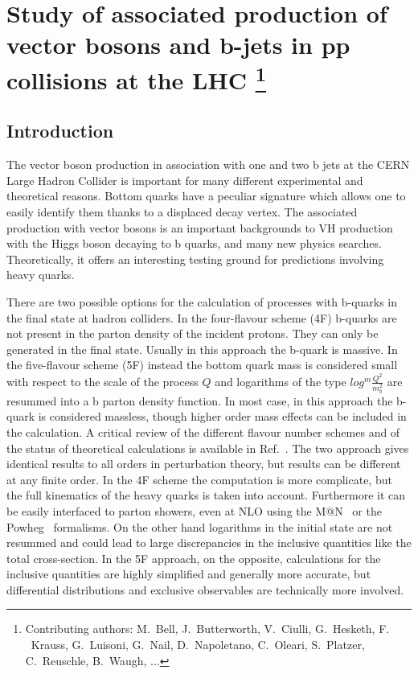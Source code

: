 \documentclass[11pt]{cernrep} \usepackage{graphicx,epsfig} 
\makeatletter
\newcommand{\MCatNLO}{M\protect\scalebox{0.8}{C}@N\protect\scalebox{0.8}{LO}\xspace}
\makeatother
\begin{document}
\section{Study of associated production of vector bosons and b-jets in
  pp collisions at the LHC \protect\footnote{Contributing authors:
    M.~Bell, J.~Butterworth,  V.~Ciulli,
    G.~Hesketh, F. ~Krauss, G.~Luisoni, G.~Nail, D.~Napoletano,
    C.~Oleari, S.~Platzer, C.~Reuschle, B.~Waugh, ... }}

\subsection{Introduction}

The vector boson production in association with one and two b jets at the CERN Large Hadron Collider is important for
many different experimental and theoretical reasons. Bottom quarks have a peculiar signature which allows one to easily
identify them thanks to a displaced decay vertex. The associated production with vector bosons is an important
backgrounds to VH production with the Higgs boson decaying to b quarks, and many new physics searches. Theoretically,
it offers an interesting testing ground for predictions involving heavy quarks. 

There are two possible options for the
calculation of processes with b-quarks in the final state at hadron colliders. In the four-flavour scheme (4F) b-quarks
are not present in the parton density of the incident protons. They can only be generated in the final state. Usually in
this approach the b-quark is massive. In the five-flavour scheme (5F) instead the bottom quark mass is considered small with
respect to the scale of the process $Q$ and logarithms of the type $log^m\frac{Q^2}{m_b^2}$ are resummed into a b parton
density function. In most case, in this approach the b-quark is considered massless, though higher order mass effects
can be included in the calculation. A critical review of the different flavour number schemes and of the
status of theoretical calculations is available in Ref.~\cite{Maltoni:2012pa}. The two approach gives identical results
to all orders in perturbation theory, but results can be different at any finite order. In the 4F scheme the computation
is more complicate, but the full kinematics of the heavy quarks is taken into account. Furthermore it can be easily
interfaced to parton showers, even at NLO using the \MCatNLO~\cite{Frixione:2002ik} or the Powheg~\cite{Nason:2004rx} formalisms. 
On the other hand logarithms in the initial state are not resummed and could lead to large discrepancies in the
inclusive quantities like the total cross-section. In the 5F approach, on the opposite, calculations for the inclusive
quantities are highly simplified and generally more accurate, but differential distributions and exclusive observables are
technically more involved. 
\end{document}
